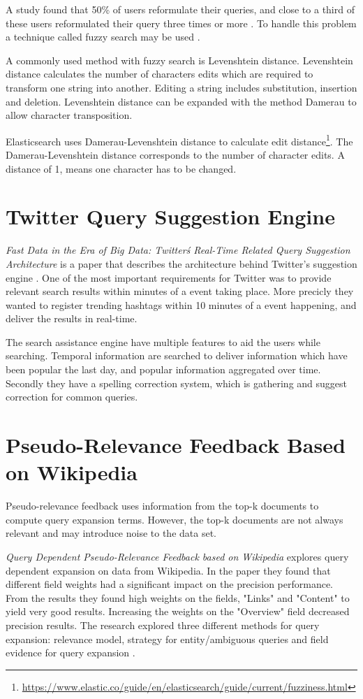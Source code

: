 A study found that 50\% of users reformulate their queries, and close to a third of these users reformulated their query three times or more \cite{query-reformulate}.
To handle this problem a technique called fuzzy search may be used \cite{fuzzy-search}.

A commonly used method with fuzzy search is Levenshtein distance.
Levenshtein distance calculates the number of characters edits which are required to transform one string into another.
Editing a string includes substitution, insertion and deletion.
Levenshtein distance can be expanded with the method Damerau to allow character transposition.

Elasticsearch uses Damerau-Levenshtein distance to calculate edit distance\footnote{\url{https://www.elastic.co/guide/en/elasticsearch/guide/current/fuzziness.html}}.
The Damerau-Levenshtein distance corresponds to the number of character edits.
A distance of 1, means one character has to be changed.

\section{Twitter Query Suggestion Engine}
\textit{Fast Data in the Era of Big Data: Twitter\'s Real-Time Related Query Suggestion Architecture} is a paper that describes the architecture behind Twitter's suggestion engine \cite{twitter-suggestion}.
One of the most important requirements for Twitter was to provide relevant search results within minutes of a event taking place.
More precicly they wanted to register trending hashtags within 10 minutes of a event happening, and deliver the results in real-time.

The search assistance engine have multiple features to aid the users while searching.
Temporal information are searched to deliver information which have been popular the last day, and popular information aggregated over time.
Secondly they have a spelling correction system, which is gathering and suggest correction for common queries.

\section{Pseudo-Relevance Feedback Based on Wikipedia}
Pseudo-relevance feedback uses information from the top-k documents to compute query expansion terms.
However, the top-k documents are not always relevant and may introduce noise to the data set.

\textit{Query Dependent Pseudo-Relevance Feedback based on Wikipedia} explores query dependent expansion on data from Wikipedia.
In the paper they found that different field weights had a significant impact on the precision performance.
From the results they found high weights on the fields, "Links" and "Content" to yield very good results.
Increasing the weights on the "Overview" field decreased precision results.
The research explored three different methods for query expansion:
relevance model, strategy for entity/ambiguous queries and field evidence for query expansion \cite{pseudo-relevance-wikipedia}.
